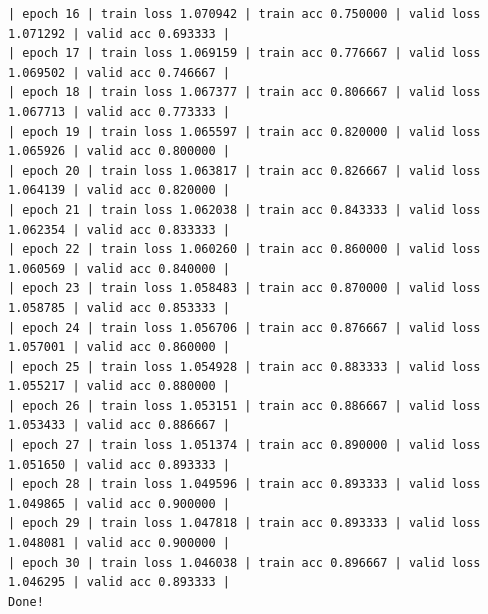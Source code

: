 \documentclass[10pt]{article}
\begin{document}
\begin{verbatim}
| epoch 16 | train loss 1.070942 | train acc 0.750000 | valid loss 1.071292 | valid acc 0.693333 |
| epoch 17 | train loss 1.069159 | train acc 0.776667 | valid loss 1.069502 | valid acc 0.746667 |
| epoch 18 | train loss 1.067377 | train acc 0.806667 | valid loss 1.067713 | valid acc 0.773333 |
| epoch 19 | train loss 1.065597 | train acc 0.820000 | valid loss 1.065926 | valid acc 0.800000 |
| epoch 20 | train loss 1.063817 | train acc 0.826667 | valid loss 1.064139 | valid acc 0.820000 |
| epoch 21 | train loss 1.062038 | train acc 0.843333 | valid loss 1.062354 | valid acc 0.833333 |
| epoch 22 | train loss 1.060260 | train acc 0.860000 | valid loss 1.060569 | valid acc 0.840000 |
| epoch 23 | train loss 1.058483 | train acc 0.870000 | valid loss 1.058785 | valid acc 0.853333 |
| epoch 24 | train loss 1.056706 | train acc 0.876667 | valid loss 1.057001 | valid acc 0.860000 |
| epoch 25 | train loss 1.054928 | train acc 0.883333 | valid loss 1.055217 | valid acc 0.880000 |
| epoch 26 | train loss 1.053151 | train acc 0.886667 | valid loss 1.053433 | valid acc 0.886667 |
| epoch 27 | train loss 1.051374 | train acc 0.890000 | valid loss 1.051650 | valid acc 0.893333 |
| epoch 28 | train loss 1.049596 | train acc 0.893333 | valid loss 1.049865 | valid acc 0.900000 |
| epoch 29 | train loss 1.047818 | train acc 0.893333 | valid loss 1.048081 | valid acc 0.900000 |
| epoch 30 | train loss 1.046038 | train acc 0.896667 | valid loss 1.046295 | valid acc 0.893333 |
Done!
\end{verbatim}
\end{document}
